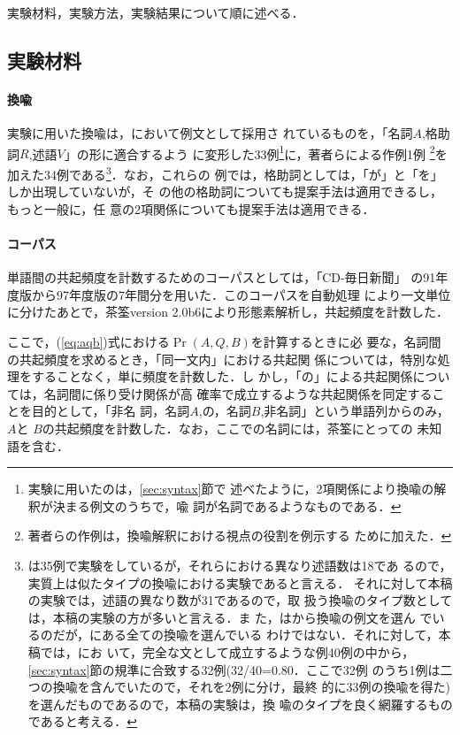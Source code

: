 実験材料，実験方法，実験結果について順に述べる．

\subsection{実験材料}
\label{sec:material}

\paragraph{換喩}

実験に用いた換喩は，\cite{yamanashi88}において例文として採用さ
れているものを，「名詞$A$,格助詞$R$,述語$V$」の形に適合するよう
に変形した33例\footnote{実験に用いたのは，\ref{sec:syntax}節で
  述べたように，2項関係により換喩の解釈が決まる例文のうちで，喩
  詞が名詞であるようなものである．}に，著者らによる作例1例
\footnote{著者らの作例は，換喩解釈における視点の役割を例示する
  ために加えた．}を加えた34例である\footnote{\cite{yamamoto98}
  は35例で実験をしているが，それらにおける異なり述語数は18であ
  るので，実質上は似たタイプの換喩における実験であると言える．
  それに対して本稿の実験では，述語の異なり数が31であるので，取
  扱う換喩のタイプ数としては，本稿の実験の方が多いと言える．ま
  た，\cite{yamamoto98}は\cite{yamanashi88}から換喩の例文を選ん
  でいるのだが，\cite{yamanashi88}にある全ての換喩を選んでいる
  わけではない．それに対して，本稿では，\cite{yamanashi88}にお
  いて，完全な文として成立するような例40例の中から，
  \ref{sec:syntax}節の規準に合致する32例(32/40=0.80．ここで32例
  のうち1例は二つの換喩を含んでいたので，それを2例に分け，最終
  的に33例の換喩を得た)を選んだものであるので，本稿の実験は，換
  喩のタイプを良く網羅するものであると考える．}．なお，これらの
例では，格助詞としては，「が」と「を」しか出現していないが，そ
の他の格助詞についても提案手法は適用できるし，もっと一般に，任
意の2項関係についても提案手法は適用できる．

\paragraph{コーパス}
 
単語間の共起頻度を計数するためのコーパスとしては，「CD-毎日新聞」
の91年度版から97年度版の7年間分を用いた．このコーパスを自動処理
により一文単位に分けたあとで，茶筌version
2.0b6\cite{matsumoto97}により形態素解析し，共起頻度を計数した．

ここで，(\ref{eq:aqb})式における$\Pr(A,Q,B)$を計算するときに必
要な，名詞間の共起頻度を求めるとき，「同一文内」における共起関
係については，特別な処理をすることなく，単に頻度を計数した．し
かし，「の」による共起関係については，名詞間に係り受け関係が高
確率で成立するような共起関係を同定することを目的として，「非名
詞，名詞$A$,の，名詞$B$,非名詞」という単語列からのみ，$A$と
$B$の共起頻度を計数した．なお，ここでの名詞には，茶筌にとっての
未知語を含む．

